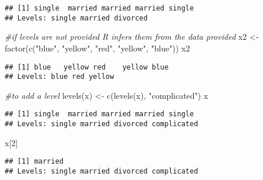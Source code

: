 \documentclass[
]{article}
\newenvironment{Shaded}{\begin{snugshade}}{\end{snugshade}}
\newcommand{\CommentTok}[1]{\textcolor[rgb]{0.56,0.35,0.01}{\textit{#1}}}
\newcommand{\DecValTok}[1]{\textcolor[rgb]{0.00,0.00,0.81}{#1}}
\newcommand{\FunctionTok}[1]{\textcolor[rgb]{0.00,0.00,0.00}{#1}}
\newcommand{\NormalTok}[1]{#1}
\newcommand{\OtherTok}[1]{\textcolor[rgb]{0.56,0.35,0.01}{#1}}
\newcommand{\StringTok}[1]{\textcolor[rgb]{0.31,0.60,0.02}{#1}}
\begin{document}
\begin{verbatim}
## [1] single  married married married single 
## Levels: single married divorced
\end{verbatim}

\begin{Shaded}
\begin{Highlighting}[]
\CommentTok{\#if levels are not provided R infers them from the data provided}
\NormalTok{x2 }\OtherTok{\textless{}{-}} \FunctionTok{factor}\NormalTok{(}\FunctionTok{c}\NormalTok{(}\StringTok{"blue"}\NormalTok{, }\StringTok{"yellow"}\NormalTok{, }\StringTok{"red"}\NormalTok{, }\StringTok{"yellow"}\NormalTok{, }\StringTok{"blue"}\NormalTok{))}
\NormalTok{x2}
\end{Highlighting}
\end{Shaded}

\begin{verbatim}
## [1] blue   yellow red    yellow blue  
## Levels: blue red yellow
\end{verbatim}

\begin{Shaded}
\begin{Highlighting}[]
\CommentTok{\#to add a level}
\FunctionTok{levels}\NormalTok{(x) }\OtherTok{\textless{}{-}} \FunctionTok{c}\NormalTok{(}\FunctionTok{levels}\NormalTok{(x), }\StringTok{"complicated"}\NormalTok{) }
\NormalTok{x}
\end{Highlighting}
\end{Shaded}

\begin{verbatim}
## [1] single  married married married single 
## Levels: single married divorced complicated
\end{verbatim}

\begin{Shaded}
\begin{Highlighting}[]
\NormalTok{x[}\DecValTok{2}\NormalTok{]}
\end{Highlighting}
\end{Shaded}

\begin{verbatim}
## [1] married
## Levels: single married divorced complicated
\end{verbatim}
\end{document}
